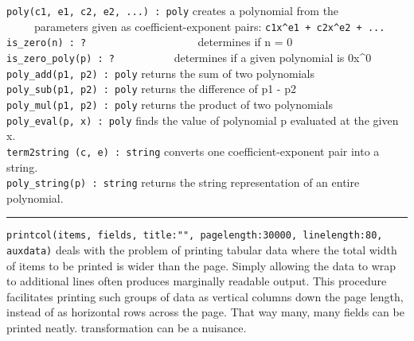 \texttt{poly(c1, e1, c2, e2, ...) : poly} creates a polynomial from
the\\
 \ \ \ \ \ parameters given as coefficient-exponent pairs:
\texttt{c1x\^{}e1 + c2x\^{}e2 + ...}\\
\texttt{is\_zero(n) : ?
\ }\ \ \ \ \ \ \ \ \ \ \ \ \ \ \ \ \ \ determines if n = 0\\
\texttt{is\_zero\_poly(p) : ?} \ \ \ \ \ \ \ \ \ \ determines if a given
polynomial is 0x\^{}0\\
\texttt{poly\_add(p1, p2) : poly} returns the sum of two
polynomials\\
\texttt{poly\_sub(p1, p2) : poly} returns the difference of p1 -
p2\\
\texttt{poly\_mul(p1, p2) : poly} returns the product of two
polynomials\\
\texttt{poly\_eval(p, x) : poly} finds the value of polynomial p
evaluated at the given x.\\
\texttt{term2string (c, e) : string} converts one coefficient-exponent
pair into a string.\\
\texttt{poly\_string(p) : string} returns the string representation of
an entire polynomial. 

\vspace{0.25cm}\hrule{}

\texttt{printcol(items, fields, title:"",
pagelength:30000, linelength:80, auxdata)} deals with the problem of
printing tabular data where the total width of items to be printed is
wider than the page. Simply allowing the data to wrap to additional
lines often produces marginally readable output. This procedure
facilitates printing such groups of data as vertical columns down the
page length, instead of as horizontal rows across the page. That way
many, many fields can be printed neatly.%
transformation can be a nuisance.%




